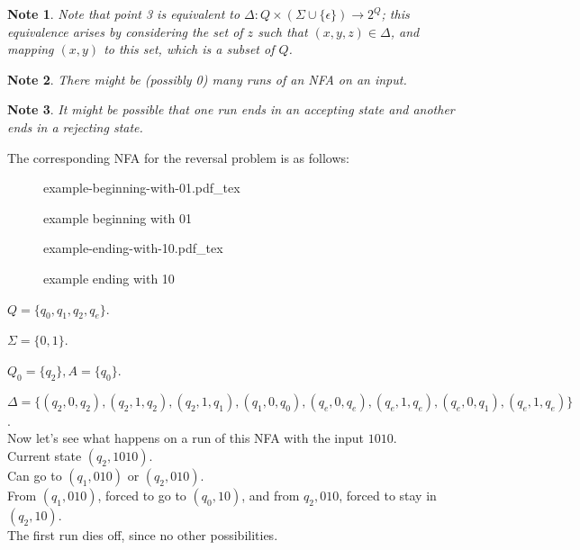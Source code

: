 \documentclass[a4paper]{article}
\newtheorem{note}{Note}
\newcommand{\incfig}[1]{%
    \def\svgwidth{\columnwidth}
    {#1.pdf_tex}
}
\begin{document}
\begin{note}
    Note that point 3 is equivalent to $\Delta : Q \times \left(\Sigma \cup \{\epsilon\}\right) \to 2^Q$; this equivalence arises by considering the set of $z$ such that $(x, y, z) \in
    \Delta$, and mapping $(x, y)$ to this set, which is a subset of $Q$.
\end{note}

\begin{note}
    There might be (possibly 0) many runs of an NFA on an input.
\end{note}

\begin{note}
    It might be possible that one run ends in an accepting state and another ends in a rejecting state.
\end{note}

The corresponding NFA for the reversal problem is as follows:

\begin{figure}[ht]
    \centering
    \incfig{example-beginning-with-01}
    \caption{example beginning with 01}
    \label{fig:example-beginning-with-01}
\end{figure}

\begin{figure}[ht]
    \centering
    \incfig{example-ending-with-10}
    \caption{example ending with 10}
    \label{fig:example-ending-with-10}
\end{figure}

$Q = \{q_0, q_1, q_2, q_e\}$.

$\Sigma = \{0, 1\}$.

$Q_0 = \{q_2\}, A = \{q_0\}$.

$\Delta = \{(q_2, 0, q_2), (q_2, 1, q_2), (q_2, 1, q_1), (q_1, 0, q_0), (q_e, 0, q_e), (q_e, 1, q_e), (q_e, 0, q_1), (q_e, 1, q_e)\}$.\\

Now let's see what happens on a run of this NFA with the input $1010$.\\

Current state $(q_2, 1010)$.\\

Can go to $(q_1, 010)$ or $(q_2, 010)$.\\

From $(q_1, 010)$, forced to go to $(q_0, 10)$, and from $q_2, 010$, forced to stay in $(q_2, 10)$.\\

The first run dies off, since no other possibilities.\\
\end{document}
